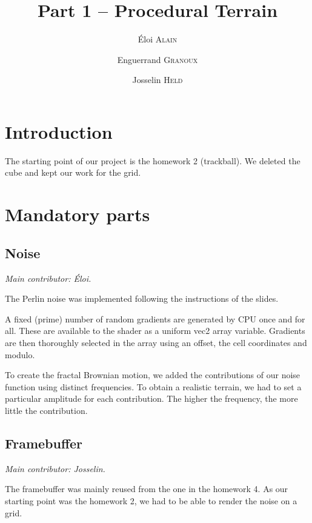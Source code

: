\documentclass[12pt]{article}
\begin{document}
\title{Part 1 -- Procedural Terrain}
\author{Éloi \textsc{Alain} \and Enguerrand \textsc{Granoux} \and Josselin \textsc{Held}}
\date{}

\maketitle

\tableofcontents

\section{Introduction}

The starting point of our project is the homework 2 (trackball). We deleted the cube and kept our work for the grid.

\section{Mandatory parts}

\subsection{Noise}

{\it Main contributor: Éloi.}

The Perlin noise was implemented following the instructions of the slides.

A fixed (prime) number of random gradients are generated by CPU once and for all. These are available to the shader as a uniform vec2 array variable. Gradients are then thoroughly selected in the array using an offset, the cell coordinates and modulo.

To create the fractal Brownian motion, we added the contributions of our noise function using distinct frequencies. To obtain a realistic terrain, we had to set a particular amplitude for each contribution. The higher the frequency, the more little the contribution.

\subsection{Framebuffer}

{\it Main contributor: Josselin.}

The framebuffer was mainly reused from the one in the homework 4. As our starting point was the homework 2, we had to be able to render the noise on a grid. 
\end{document}
